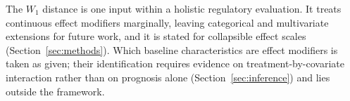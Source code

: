 \documentclass[AMA,Times1COL]{WileyNJDv5}
\begin{document}
The $W_1$ distance is one input within a holistic regulatory evaluation.\cite{matsushima2024} It treats continuous effect modifiers marginally, leaving categorical and multivariate extensions for future work, and it is stated for collapsible effect scales (Section~\ref{sec:methods}). Which baseline characteristics are effect modifiers is taken as given; their identification requires evidence on treatment-by-covariate interaction rather than on prognosis alone (Section~\ref{sec:inference}) and lies outside the framework.
\end{document}
